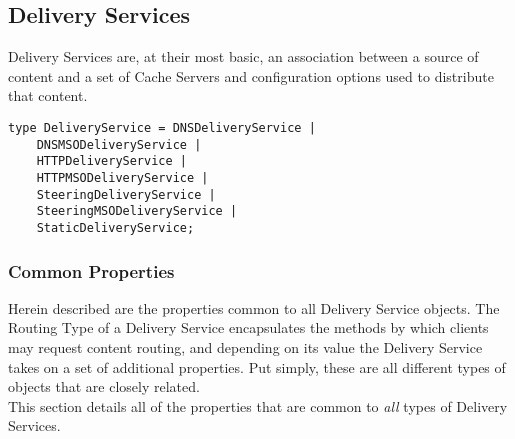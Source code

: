 %
%

\subsection{Delivery Services}
Delivery Services are, at their most basic, an association between a source of
content and a set of Cache Servers and configuration options used to distribute
that content.

\begin{codelisting}
\begin{verbatim}
type DeliveryService = DNSDeliveryService |
	DNSMSODeliveryService |
	HTTPDeliveryService |
	HTTPMSODeliveryService |
	SteeringDeliveryService |
	SteeringMSODeliveryService |
	StaticDeliveryService;
\end{verbatim}
\end{codelisting}

\subsubsection{Common Properties}
Herein described are the properties common to all Delivery Service objects. The
Routing Type of a Delivery Service encapsulates the methods by which clients
may request content routing, and depending on its value the Delivery Service
takes on a set of additional properties. Put simply, these are all different
types of objects that are closely related.\\
This section details all of the properties that are common to \emph{all} types
of Delivery Services.

